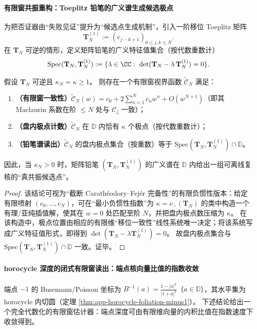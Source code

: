 \paragraph{有限窗共振重构：Toeplitz 铅笔的广义谱生成候选极点}
为把否证器由“失败见证”提升为“候选点生成机制”，引入一阶移位 Toeplitz 矩阵
\[
\mathbf{T}_N^{(1)}:=(c_{j-k+1})_{0\le j,k\le N}.
\]
在 \(\mathbf{T}_N\) 可逆的情形，定义矩阵铅笔的广义特征值集合（按代数重数计）
\[
\mathrm{Spec}(\mathbf{T}_N,\mathbf{T}_N^{(1)})
:=\{\lambda\in\CC:\ \det(\mathbf{T}_N-\lambda\,\mathbf{T}_N^{(1)})=0\}.
\]

\begin{theorem}\label{thm:xi-resonance-pencil-reconstruction}
假设 \(\mathbf{T}_N\) 可逆且 \(\kappa_N=\kappa\ge 1\)。
则存在一个有限窗视界函数 \(\widetilde{\mathscr{C}}_{N}\) 满足：
\begin{enumerate}
  \item \textbf{（有限窗一致性）}\(\widetilde{\mathscr{C}}_{N}(w)=c_0+2\sum_{n=1}^{N}c_n w^n+O(w^{N+1})\)（即其 Maclaurin 系数在阶 \(\le N\) 处与 \(\mathscr{C}_{\zeta}\) 一致）；
  \item \textbf{（盘内极点计数）}\(\widetilde{\mathscr{C}}_{N}\) 在 \(\mathbb{D}\) 内恰有 \(\kappa\) 个极点（按代数重数计）；
  \item \textbf{（铅笔谱读出）}\(\widetilde{\mathscr{C}}_{N}\) 的盘内极点集合（按重数）等于
  \(\mathrm{Spec}(\mathbf{T}_N,\mathbf{T}_N^{(1)})\cap\mathbb{D}\)。
\end{enumerate}
因此，当 \(\kappa_N>0\) 时，矩阵铅笔 \((\mathbf{T}_N,\mathbf{T}_N^{(1)})\) 的广义谱在 \(\mathbb{D}\) 内给出一组可离线复核的“真共振候选点”。
\end{theorem}

\begin{proof}
该结论可视为“截断 Carath\'eodory--Fej\'er 完备性”的有限负惯性版本：给定有限喷射 \((c_0,\dots,c_N)\)，可在“最小负惯性指数”为 \(\kappa=\nu_-(\mathbf{T}_N)\) 的类中构造一个有理/亚纯插值解，使其在 \(w=0\) 处匹配至阶 \(N\)，并把盘内极点数压缩为 \(\kappa\)。
在该构造中，极点位置由相应的有限维“移位一致性”线性系统唯一决定；将该系统写成广义特征值形式，即得到 \(\det(\mathbf{T}_N-\lambda \mathbf{T}_N^{(1)})=0\)。
故盘内极点集合与 \(\mathrm{Spec}(\mathbf{T}_N,\mathbf{T}_N^{(1)})\cap\mathbb{D}\) 一致。证毕。
\end{proof}

\paragraph{horocycle 深度的闭式有限窗读出：端点核向量比值的指数收敛}
端点 \(-1\) 的 Busemann/Poisson 坐标为
\(
B^{-1}(a)=\frac{1-|a|^2}{|1+a|^2}
\)（\(a\in\mathbb{D}\)），其水平集为 horocycle 内切圆（定理 \ref{thm:app-horocycle-foliation-minus1}）。
下述结论给出一个完全代数化的有限窗估计器：端点深度可由有限维向量的内积比值在指数速度下收敛得到。

